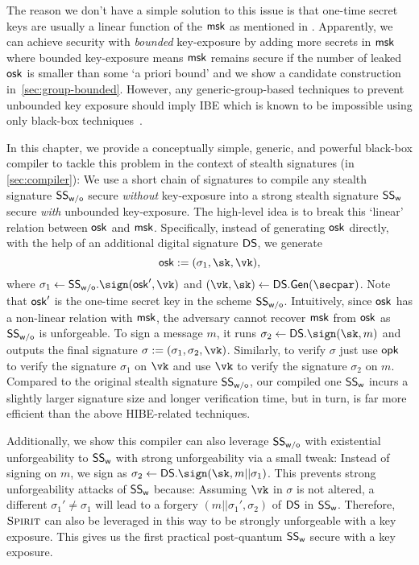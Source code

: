 The reason we don't have a simple solution to this issue is that one-time secret keys are usually a linear function of the $\mathsf{msk}$ as mentioned in \cite{CCS:LRRSTW19}. Apparently, we can achieve security with \emph{bounded} key-exposure by adding more secrets in $\mathsf{msk}$ where bounded key-exposure means $\mathsf{msk}$ remains secure if the number of leaked $\mathsf{osk}$ is smaller than some `a priori bound' and we show a candidate construction in~\cref{sec:group-bounded}. However, any generic-group-based techniques to prevent unbounded key exposure should imply IBE which is known to be impossible using only black-box techniques~\cite{EPRINT:PapRacVah12,EPRINT:SchSeg21}.

In this chapter, we provide a conceptually simple, generic, and powerful black-box compiler to tackle this problem in the context of stealth signatures (in \cref{sec:compiler}): We use a short chain of signatures\cite{C:Merkle89a} to compile any stealth signature $\mathsf{SS}_{\mathsf{w/o}}$ secure \emph{without} key-exposure into a strong stealth signature $\mathsf{SS}_{\mathsf{w}}$ secure \emph{with} unbounded key-exposure. The high-level idea is to break this `linear' relation between $\mathsf{osk}$ and $\mathsf{msk}$.
Specifically, instead of generating $\mathsf{osk}$ directly, with the help of an additional digital signature $\mathsf{DS}$, we generate $$\osk:=(\sigma_1,\sk,\vk),$$ where $\sigma_1\gets\SS_\msf{w/o}.\sign(\osk',\vk)$ and $(\vk,\sk)\gets\DS.\gen(\secpar)$. Note that $\mathsf{osk}'$ is the one-time secret key in the scheme $\mathsf{SS}_{\mathsf{w/o}}$. Intuitively, since $\mathsf{osk}$ has a non-linear relation with $\mathsf{msk}$, the adversary cannot recover $\mathsf{msk}$ from $\mathsf{osk}$ as $\mathsf{SS}_{\mathsf{w/o}}$ is unforgeable. To sign a message $m$, it runs $\sigma_2\gets\DS.\sign(\sk,m)$ and outputs the final signature $\sigma:=(\sigma_1,\sigma_2,\vk)$. Similarly, to verify $\sigma$ just use $\mathsf{opk}$ to verify the signature $\sigma_1$ on $\vk$ and use $\vk$ to verify the signature $\sigma_2$ on $m$. Compared to the original stealth signature $\mathsf{SS}_{\mathsf{w/o}}$, our compiled one $\mathsf{SS}_{\mathsf{w}}$ incurs a slightly larger signature size and longer verification time, but in turn, is far more efficient than the above HIBE-related techniques.

Additionally, we show this compiler can also leverage $\mathsf{SS}_{\mathsf{w/o}}$ with existential unforgeability to $\mathsf{SS}_{\mathsf{w}}$ with strong unforgeability via a small tweak: Instead of signing on $m$, we sign as $\sigma_2\gets\DS.\sign(\sk,m||\sigma_1)$. This prevents strong unforgeability attacks of $\mathsf{SS}_{\mathsf{w}}$ because: Assuming $\vk$ in $\sigma$ is not altered, a different $\sigma_1'\ne\sigma_1$ will lead to a forgery $(m||\sigma_1', \sigma_2)$ of $\mathsf{DS}$ in $\mathsf{SS}_{\mathsf{w}}$. Therefore, $\textsc{Spirit}$ can also be leveraged in this way to be strongly unforgeable with a key exposure. This gives us the first practical post-quantum $\mathsf{SS}_{\mathsf{w}}$ secure with a key exposure.

